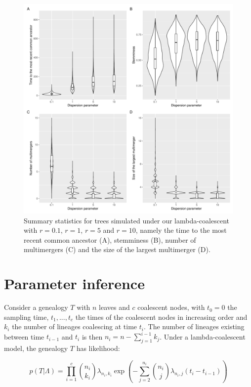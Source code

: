 \documentclass{article}
\begin{document}
\begin{figure}[!p]
\begin{center}
\includegraphics[width=15cm]{../run/figureStats.pdf}
\end{center}
\caption{Summary statistics for trees simulated under our lambda-coalescent with $r=0.1$, $r=1$, $r=5$ and $r=10$, namely the time to the most recent common ancestor (A), stemminess (B), number of multimergers (C) and the size of the largest multimerger (D).
\label{fig:stats}}
\end{figure}

\section{Parameter inference}

Consider a genealogy $T$ with $n$ leaves and $c$ coalescent nodes, with $t_0=0$ the
sampling time,
$t_1,...,t_c$ the times of the coalescent nodes in increasing order and $k_i$ the number
of lineages coalescing at time $t_i$. The number of lineages existing between
time $t_{i-1}$ and $t_i$ is then $n_i=n-\sum_{j=1}^{i-1} k_j$.
Under a lambda-coalescent model, the genealogy $T$ has likelihood:

\begin{equation}
p(T|\Lambda)=\prod_{i=1}^{c}\binom{n_i}{k_i}\lambda_{n_i,k_i}\exp\left(-\sum_{j=2}^{n_i}\binom{n_i}{j}\lambda_{n_i,j}(t_i-t_{i-1})\right)
\label{eq:likelihood}
\end{equation}
\end{document}
